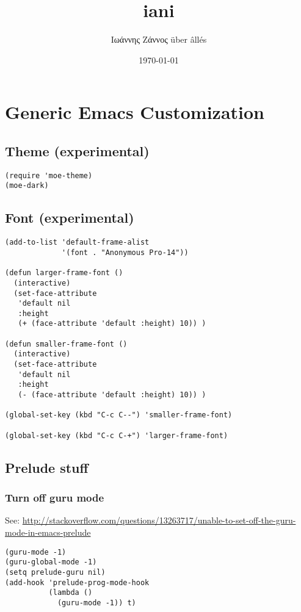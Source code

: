 \documentclass{article}
\author{Ιωάννης Ζάννος über âllés}
\date{\today}
\title{iani}
\begin{document}
\maketitle

\section{Generic Emacs Customization}
\label{sec-1}
\subsection{Theme (experimental)}
\label{sec-1-1}

\begin{verbatim}
(require 'moe-theme)
(moe-dark)
\end{verbatim}
\subsection{Font (experimental)}
\label{sec-1-2}

\begin{verbatim}
(add-to-list 'default-frame-alist
             '(font . "Anonymous Pro-14"))

(defun larger-frame-font ()
  (interactive)
  (set-face-attribute
   'default nil
   :height
   (+ (face-attribute 'default :height) 10)) )

(defun smaller-frame-font ()
  (interactive)
  (set-face-attribute
   'default nil
   :height
   (- (face-attribute 'default :height) 10)) )

(global-set-key (kbd "C-c C--") 'smaller-frame-font)

(global-set-key (kbd "C-c C-+") 'larger-frame-font)
\end{verbatim}

\subsection{Prelude stuff}
\label{sec-1-3}
\subsubsection{Turn off guru mode}
\label{sec-1-3-1}
See: \url{http://stackoverflow.com/questions/13263717/unable-to-set-off-the-guru-mode-in-emacs-prelude}

\begin{verbatim}
(guru-mode -1)
(guru-global-mode -1)
(setq prelude-guru nil)
(add-hook 'prelude-prog-mode-hook
          (lambda ()
            (guru-mode -1)) t)
\end{verbatim}
\end{document}
